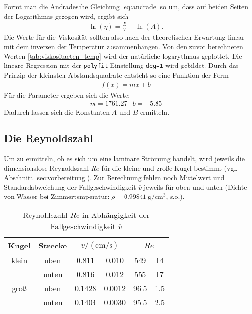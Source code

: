 %
\noindent
Formt man die Andradesche Gleichung \eqref{eq:andrade} so um, dass auf beiden Seiten der Logarithmus gezogen wird, ergibt sich
\begin{align}
    \ln {\left( \eta \right)} = \frac{B}{T} + \ln{\left( A \right)}.
\end{align}
Die Werte für die Viskosität sollten also nach der theoretischen Erwartung linear mit dem inversen der Temperatur zusammenhängen.
Von den zuvor berechneten Werten \ref{tab:viskositaeten_temp} wird der natürliche logarythmus geplottet.
Die lineare Regression mit der \texttt{polyfit} Einstellung \texttt{deg=1} wird gebildet.
Durch das Prinzip der kleinsten Abstandsquadrate entsteht so eine Funktion der Form
\begin{align*}
    f(x) = mx + b
\end{align*}
Für die Parameter ergeben sich die Werte:
\begin{align*}
    m = 1761.27 & b = -5.85
\end{align*}
Dadurch lassen sich die Konstanten $A$ und $B$ ermitteln.


\subsection[]{Die Reynoldszahl}
Um zu ermitteln, ob es sich um eine laminare Strömung handelt, wird jeweils die dimensionslose Reynoldszahl $Re$ für die kleine und große Kugel bestimmt
(vgl. Abschnitt \ref{sec:vorbereitung}).
Zur Berechnung fehlen noch Mittelwert und Standardabweichung der Fallgeschwindigkeit $\overline{v}$ jeweils für oben und unten
(Dichte von Wasser bei Zimmertemperatur: $\rho = \qty{0.99841}{\g \per \cm^3}$, s.o.).

\begin{table}
    \caption[]{Reynoldszahl $Re$ in Abhängigkeit der Fallgeschwindigkeit $\overline{v}$}
    \label{tab:reynold}
    \centering
    \begin{tabular}[]{S S S[table-format=1.4] @{${}\pm{}$} S[table-format=1.4] S[table-format=4.1] @{${}\pm{}$} S[table-format=3.1]}
        \toprule
        {Kugel} & {Strecke} &  &  \\
        \bottomrule
        {klein} & {oben} & 0.811 & 0.010 & 549 & 14 \\
         & {unten} & 0.816 & 0.012 & 555 & 17 \\
        {groß} & {oben} & 0.1428 & 0.0012 & 96.5 & 1.5 \\
         & {unten} & 0.1404 & 0.0030 & 95.5 & 2.5 \\
    \end{tabular}
\end{table}


